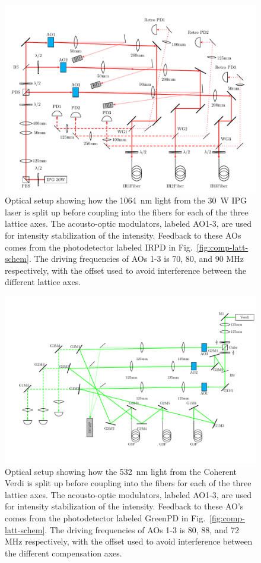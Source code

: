 \begin{figure}
\centering
\includegraphics[width=\textwidth]{../ernie-figures/lattice/setup/lattices.pdf}
\caption[1064~nm setup]{\small Optical setup showing how the 1064~nm light from
the 30~W IPG laser is split up before coupling into the fibers for each of the
three lattice axes. The acousto-optic modulators, labeled AO1-3, are used for
intensity stabilization of the intensity.   Feedback to these AOs comes from
the photodetector labeled IRPD in Fig.~\ref{fig:comp-latt-schem}.  The driving
frequencies of AOs 1-3 is 70, 80, and 90 MHz respectively, with the offset used
to avoid interference between the different lattice axes.  }
\label{fig:1064setup} 
\end{figure}
\begin{figure}
\centering
\includegraphics[width=\textwidth]{../ernie-figures/lattice/setup/green.pdf}
\caption[532~nm setup]{\small Optical setup showing how the 532~nm light from
the Coherent Verdi is split up before coupling into the fibers for each of the
three lattice axes. The acousto-optic modulators, labeled AO1-3, are used for
intensity stabilization of the intensity.   Feedback to these AO's comes from
the photodetector labeled GreenPD in Fig.~\ref{fig:comp-latt-schem}. The
driving frequencies of AOs 1-3 is 80, 88, and 72 MHz respectively, with the
offset used to avoid interference between the different compensation axes. }
\label{fig:532setup} 
\end{figure}




